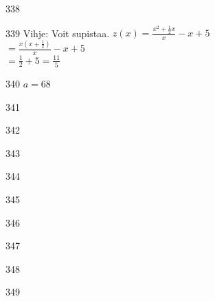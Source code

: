 \begin{Vastaus}{338}
	
\end{Vastaus}
\begin{Vastaus}{339}
	Vihje: Voit supistaa. $z(x) = \frac{x^2+\frac{1}{2}x}{x}-x+5$ \\ $= \frac{x(x+\frac{1}{2})}{x}-x+5$ \\ $= \frac{1}{2}+5 = \frac{11}{5}$
  
\end{Vastaus}
\begin{Vastaus}{340}
$a=68$
	
\end{Vastaus}
\begin{Vastaus}{341}
	
\end{Vastaus}
\begin{Vastaus}{342}
    
\end{Vastaus}
\begin{Vastaus}{343}
    
\end{Vastaus}
\begin{Vastaus}{344}
	
\end{Vastaus}
\begin{Vastaus}{345}
    
\end{Vastaus}
\begin{Vastaus}{346}
  
\end{Vastaus}
\begin{Vastaus}{347}
\end{Vastaus}
\begin{Vastaus}{348}
\end{Vastaus}
\begin{Vastaus}{349}
\end{Vastaus}
